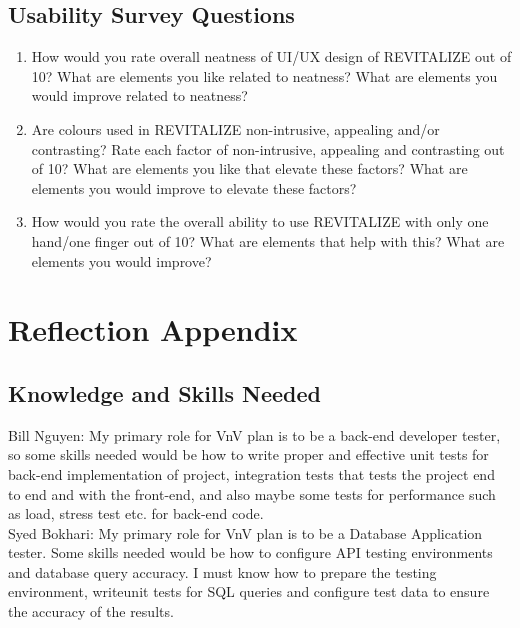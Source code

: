 \documentclass[12pt, titlepage]{article}
\begin{document}

\subsection{Usability Survey Questions}

\begin{enumerate}
	\item How would you rate overall neatness of UI/UX design of REVITALIZE out of 10? What are elements you like related to neatness? What are elements you would improve related to neatness?
	\item Are colours used in REVITALIZE non-intrusive, appealing and/or contrasting? Rate each factor of non-intrusive, appealing and contrasting out of 10? What are elements you like that elevate these factors? What are elements you would improve to elevate these factors?
	\item How would you rate the overall ability to use REVITALIZE with only one hand/one finger out of 10? What are elements that help with this? What are elements you would improve?
\end{enumerate}

\section{Reflection Appendix}

\subsection{Knowledge and Skills Needed}

\noindent Bill Nguyen: My primary role for VnV plan is to be a back-end developer tester, so some skills needed would be how to write proper and effective unit tests for back-end implementation of project, integration tests that tests the project end to end and with the front-end, and also maybe some tests for performance such as load, stress test etc. for back-end code.\\

\noindent Syed Bokhari: My primary role for VnV plan is to be a Database Application tester. Some skills needed would be how to configure API testing environments and database query accuracy. I must know how to prepare the testing environment, writeunit tests for SQL queries and configure test data to ensure the accuracy of the results.\\
\end{document}
